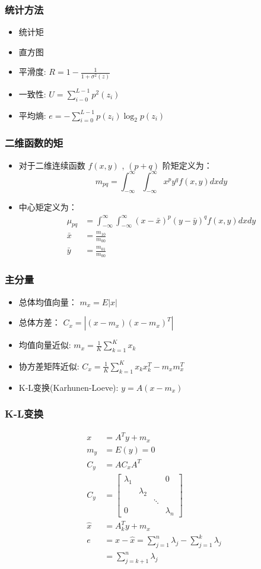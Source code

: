 \documentclass{beamer}
\begin{document}
\begin{frame}
\frametitle{统计方法}
\label{sec-4-4}

\begin{itemize}
\item 统计矩
\item 直方图
\item 平滑度: $R=1-\frac{1}{1+\sigma^2(z)}$
\item 一致性: $U=\sum_{i-0}^{L-1}p^2(z_i)$
\item 平均熵: $e=-\sum_{i=0}^{L-1}p(z_i)\log_2p (z_i)$
\end{itemize}
\end{frame}
\begin{frame}
\frametitle{二维函数的矩}
\label{sec-4-5}

\begin{itemize}
\item 对于二维连续函数 $f(x,y)$ , $(p+q)$ 阶矩定义为：
   \[ m_{pq} =\int_{-\infty}^{\infty}\int_{-\infty}^{\infty}x^p y^q f(x,y)dxdy \]
\item 中心矩定义为：
    \begin{align*}
      \mu_{pq} &=\int_{-\infty}^{\infty}\int_{-\infty}^{\infty}(x-\bar x)^p(y-\bar y)^q f(x,y)dxdy \\
       \bar x &= \frac{m_{10}}{m_{00}} \\
       \bar y &= \frac{m_{01}}{m_{00}}
    \end{align*}
\end{itemize}
\end{frame}
\begin{frame}
\frametitle{主分量}
\label{sec-4-6}

\begin{itemize}
\item 总体均值向量：  $m_x = E|x|$
\item 总体方差：  $C_x = |(x-m_x)(x-m_x)^T|$
\item 均值向量近似: $m_x= \frac{1}{K}\sum_{k=1}^K x_k$
\item 协方差矩阵近似: $C_x=\frac{1}{K}\sum_{k=1}^K x_k x_k^T-m_x m_x^T$
\item K-L变换(Karhunen-Loeve):  $y=A(x-m_x)$
\end{itemize}
\end{frame}
\begin{frame}
\frametitle{K-L变换}
\label{sec-4-7}

\begin{align*}
x &= A^T y+m_x \\
m_y & =E(y)=0 \\
C_y &=AC_xA^T \\
C_y &=\begin{bmatrix}
\lambda_1 & & & 0 \\
 & \lambda_2 & & \\
 & & \ddots & \\
0 & & & \lambda_n 
\end{bmatrix}\\
\hat x &= A_k^T y+m_x \\
e &= x-\hat x = \sum_{j=1}^n \lambda_j -\sum_{j=1}^k \lambda_j \\
  &= \sum_{j=k+1}^n \lambda_j
\end{align*}
\end{frame}
\end{document}

